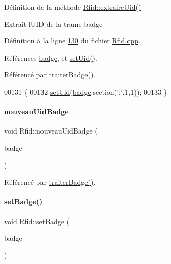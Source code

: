 Définition de la méthode \hyperlink{class_rfid_a884e849f175045d78587e1e09a87cb00}{Rfid\+::extraire\+Uid()} 

Extrait l\textquotesingle{}U\+ID de la trame badge 

Définition à la ligne \hyperlink{_rfid_8cpp_source_l00130}{130} du fichier \hyperlink{_rfid_8cpp_source}{Rfid.\+cpp}.



Références \hyperlink{_rfid_8h_source_l00056}{badge}, et \hyperlink{_rfid_8cpp_source_l00086}{set\+Uid()}.



Référencé par \hyperlink{_rfid_8cpp_source_l00097}{traiter\+Badge()}.


\begin{DoxyCode}
00131 \{
00132     \hyperlink{class_rfid_ac79b994b32bf7a7cbad9d9988e721564}{setUid}(\hyperlink{class_rfid_ac634cd26ffbe1c6da3967dc4af53b734}{badge}.section(\textcolor{charliteral}{':'},1,1));
00133 \}
\end{DoxyCode}
\mbox{\label{class_rfid_a76990ba3147098e80ac6fc67af6439d1}} 
\paragraph{\texorpdfstring{nouveau\+Uid\+Badge}{nouveauUidBadge}}
{\footnotesize\ttfamily void Rfid\+::nouveau\+Uid\+Badge (\begin{DoxyParamCaption}\item[{Q\+String}]{badge }\end{DoxyParamCaption})\hspace{0.3cm}{\ttfamily [signal]}}



Référencé par \hyperlink{_rfid_8cpp_source_l00097}{traiter\+Badge()}.

\mbox{\label{class_rfid_a51021c0899dab1d5fb08e3dd6d93e425}} 
\paragraph{\texorpdfstring{set\+Badge()}{setBadge()}}
{\footnotesize\ttfamily void Rfid\+::set\+Badge (\begin{DoxyParamCaption}\item[{Q\+String}]{badge }\end{DoxyParamCaption})}



